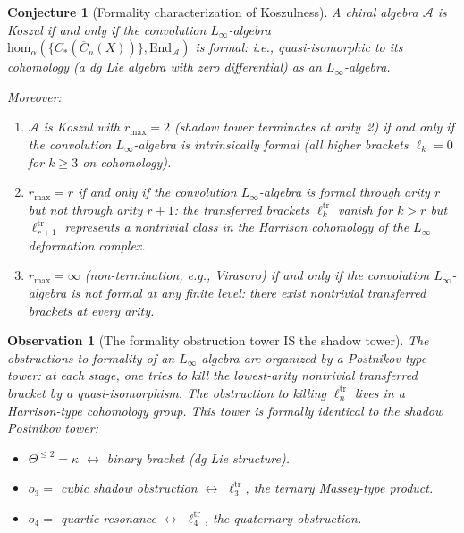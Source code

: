 \documentclass[11pt]{article}
\newtheorem{conjecture}{Conjecture}
\newtheorem{observation}{Observation}
\theoremstyle{definition}
\theoremstyle{remark}
\newcommand{\FM}{\overline{C}}
\newcommand{\cA}{\mathcal{A}}
\begin{document}
\begin{conjecture}[Formality characterization of Koszulness]
\label{conj:formality-koszulness}
A chiral algebra $\cA$ is Koszul if and only if the convolution
$L_\infty$-algebra
$\mathrm{hom}_\alpha(\{C_*(\FM_n(X))\},
\mathrm{End}_\cA)$
is \emph{formal}: i.e., quasi-isomorphic to its cohomology
(a dg Lie algebra with zero differential) as an $L_\infty$-algebra.

Moreover:
\begin{enumerate}
\item $\cA$ is Koszul with $r_{\max} = 2$
  (shadow tower terminates at arity~2) if and only if the
  convolution $L_\infty$-algebra is \emph{intrinsically formal}
  (all higher brackets $\ell_k = 0$ for $k \geq 3$ on cohomology).
\item $r_{\max} = r$ if and only if the convolution
  $L_\infty$-algebra is \emph{formal through arity $r$} but not
  through arity $r+1$: the transferred brackets $\ell_k^{\mathrm{tr}}$
  vanish for $k > r$ but $\ell_{r+1}^{\mathrm{tr}}$ represents a
  nontrivial class in the Harrison cohomology of the $L_\infty$
  deformation complex.
\item $r_{\max} = \infty$ (non-termination, e.g., Virasoro) if and
  only if the convolution $L_\infty$-algebra is \emph{not formal at
  any finite level}: there exist nontrivial transferred brackets at
  every arity.
\end{enumerate}
\end{conjecture}

\begin{observation}[The formality obstruction tower IS the shadow
tower]
The obstructions to formality of an $L_\infty$-algebra are organized
by a Postnikov-type tower: at each stage, one tries to kill the
lowest-arity nontrivial transferred bracket by a quasi-isomorphism.
The obstruction to killing $\ell_n^{\mathrm{tr}}$ lives in a
Harrison-type cohomology group.  This tower is formally identical
to the shadow Postnikov tower:
\begin{itemize}
\item $\Theta^{\leq 2} = \kappa$ $\leftrightarrow$ binary bracket
  (dg Lie structure).
\item $o_3 = $ cubic shadow obstruction $\leftrightarrow$
  $\ell_3^{\mathrm{tr}}$, the ternary Massey-type product.
\item $o_4 = $ quartic resonance $\leftrightarrow$
  $\ell_4^{\mathrm{tr}}$, the quaternary obstruction.
\end{itemize}
\end{observation}
\end{document}
